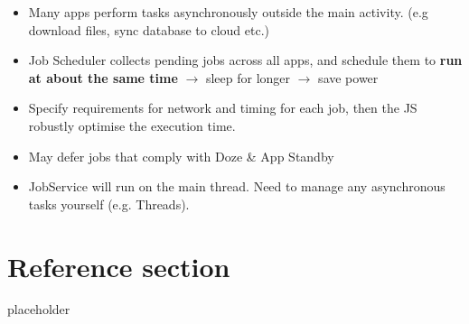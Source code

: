 \documentclass{article}
\begin{document}
\begin{itemize}
  \item Many apps perform tasks asynchronously outside the main activity. (e.g download files, sync database to cloud etc.) 
  \item Job Scheduler collects pending jobs across all apps, and schedule them to \textbf{run at about the same time} $\rightarrow$ sleep for longer $\rightarrow$ save power 
  \item Specify requirements for network and timing for each job, then the JS robustly optimise the execution time. 
  \item May defer jobs that comply with Doze \& App Standby 
  \item JobService will run on the main thread. Need to manage any asynchronous tasks yourself (e.g. Threads).
\end{itemize}

\pagebreak
\section*{Reference section} \label{sec:reference}
\begin{description}
	\item[placeholder] \hfill \\
\end{description}
\end{document}

